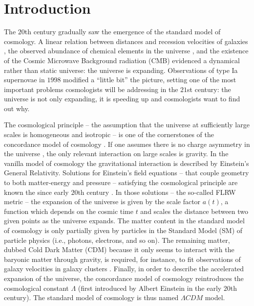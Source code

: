 \chapter*{Introduction}
\label{intro} 

The $20$th century gradually saw the emergence of the standard model of cosmology. A linear relation between distances and recession velocities of galaxies \cite{Hubble:1929ig}, the observed abundance of chemical elements in the universe \cite{Gamow:1946eb,Alpher:1948ve,Gamow:1949zz,Alpher:1950zz}, and the existence of the Cosmic Microwave Background radiation (CMB) \cite{Alpher:1950zz,Penzias:1965wn} evidenced a dynamical rather than static universe: the universe is expanding. Observations of type Ia supernovae in $1998$ \cite{Riess:1998cb,Perlmutter:1998np} modified a ``little bit'' the picture, setting one of the most important problems cosmologists will be addressing in the $21$st century: the universe is not only expanding, it is speeding up and cosmologists want to find out why. 

The cosmological principle -- the assumption that the universe at sufficiently large scales is homogeneous and isotropic -- is one of the cornerstones of the concordance model of cosmology \cite{Robertson:1935zz,Walker1937}. If one assumes there is no charge asymmetry in the universe \cite{Caprini:2003gz}, the only relevant interaction on large scales is gravity. In the vanilla model of cosmology the gravitational interaction is described by Einstein's General Relativity. Solutions for Einstein's field equations -- that couple geometry to both matter-energy and pressure -- satisfying the cosmological principle are known the since early $20$th century \cite{Friedman:1922kd,Friedmann:1924bb,Lemaitre:1927zz,Lemaitre:1931zz}. In those solutions -- the so-called FLRW metric -- the expansion of the universe is given by the scale factor $a(t)$, a function which depends on the cosmic time $t$ and scales the distance between two given points as the universe expands. The matter content in the standard model of cosmology is only partially given by particles in the Standard Model (SM) of particle physics (i.e., photons, electrons, and so on). The remaining matter, dubbed Cold Dark Matter (CDM) because it only seems to interact with the baryonic matter through gravity, is required, for instance, to fit observations of galaxy velocities in galaxy clusters \cite{Zwicky:1933gu}. Finally, in order to describe the accelerated expansion of the universe, the concordance model of cosmology reintroduces the cosmological constant $\Lambda$ (first introduced by Albert Einstein in the early $20$th century). The standard model of cosmology is thus named  $\Lambda CDM$ model.

